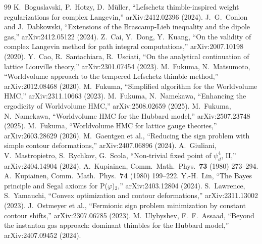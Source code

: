 \documentclass[12pt]{article}
\theoremstyle{definition}
\theoremstyle{remark}
\newcommand{\ph}{\varphi}
\begin{document}
\begin{thebibliography}{99}
 K.~Boguslavski, P.~Hotzy, D.~M\"uller,
  ``Lefschetz thimble-inspired weight regularizations for complex
  Langevin,'' arXiv:2412.02396 (2024).
 J.~G.~Conlon and J.~Dabkowski,
  ``Extensions of the Brascamp-Lieb inequality and the dipole gas,''
  arXiv:2412.05122 (2024).
 Z.~Cai, Y.~Dong, Y.~Kuang,
  ``On the validity of complex Langevin method for path integral
  computations,'' arXiv:2007.10198 (2020).
 Y.~Cao, R.~Santachiara, R.~Usciati,
  ``On the analytical continuation of lattice Liouville theory,''
  arXiv:2301.07454 (2023).
 M.~Fukuma, N.~Matsumoto,
  ``Worldvolume approach to the tempered Lefschetz thimble method,''
  arXiv:2012.08468 (2020).
 M.~Fukuma,
  ``Simplified algorithm for the Worldvolume HMC,''
  arXiv:2311.10663 (2023).
 M.~Fukuma, N.~Namekawa,
  ``Enhancing the ergodicity of Worldvolume HMC,''
  arXiv:2508.02659 (2025).
 M.~Fukuma, N.~Namekawa,
  ``Worldvolume HMC for the Hubbard model,''
  arXiv:2507.23748 (2025).
 M.~Fukuma,
  ``Worldvolume HMC for lattice gauge theories,''
  arXiv:2603.28629 (2026).
 M.~Gaentgen et al.,
  ``Reducing the sign problem with simple contour deformations,''
  arXiv:2407.06896 (2024).
 A.~Giuliani, V.~Mastropietro, S.~Rychkov, G.~Scola,
  ``Non-trivial fixed point of $\psi^4_d$, II,''
  arXiv:2404.14904 (2024).
 A.~Kupiainen,
  Comm.~Math.~Phys.~\textbf{73} (1980) 273--294.
 A.~Kupiainen,
  Comm.~Math.~Phys.~\textbf{74} (1980) 199--222.
 Y.-H.~Lin,
  ``The Bayes principle and Segal axioms for P($\ph$)$_2$,''
  arXiv:2403.12804 (2024).
 S.~Lawrence, S.~Yamauchi,
  ``Convex optimization and contour deformations,''
  arXiv:2311.13002 (2023).
 J.~Ostmeyer et al.,
  ``Fermionic sign problem minimization by constant contour shifts,''
  arXiv:2307.06785 (2023).
 M.~Ulybyshev, F.~F.~Assaad,
  ``Beyond the instanton gas approach: dominant thimbles for the
  Hubbard model,'' arXiv:2407.09452 (2024).
\end{thebibliography}
\end{document}
